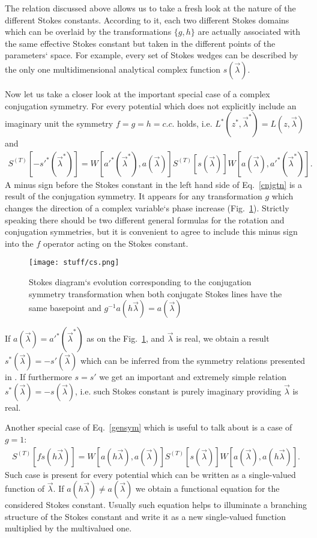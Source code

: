 \documentclass[aps,prl,preprint,superscriptaddress]{revtex4}
\begin{document}
The relation discussed above allows us to take a fresh look at the nature of the different Stokes constants. According to it, each two different Stokes domains which can be overlaid by the transformations $\{g,h\}$ are actually associated with the same effective Stokes constant but taken in the different points of the parameters` space. For example, every set of Stokes wedges can be described by the only one multidimensional analytical complex function $s(\vec{\lambda})$.

Now let us take a closer look at the important special case of a complex conjugation symmetry. For every potential which does not explicitly include an imaginary unit the symmetry $f=g=h=c.c.$ holds, i.e. $L^*(z^*,\vec{\lambda}^*)=L(z,\vec{\lambda})$ and
\begin{eqnarray}
S^{(T)}[-s'^*(\vec{\lambda}^*)] = 
W[a'^*(\vec{\lambda}^*),a(\vec{\lambda})]S^{(T)}[s(\vec{\lambda})]W[a(\vec{\lambda}),a'^*(\vec{\lambda}^*)].
\label{cnjgtn}
\end{eqnarray}
A minus sign before the Stokes constant in the left hand side of Eq.~\ref{cnjgtn} is a result of the conjugation symmetry. It appears for any transformation $g$ which changes the direction of a complex variable`s phase increase (Fig.~\ref{cs}). Strictly speaking there should be two different general formulas for the rotation and conjugation symmetries, but it is convenient to agree to include this minus sign into the $f$ operator acting on the Stokes constant.

\begin{figure}
\centering
\noindent
\texttt{[image: stuff/cs.png]}
\caption{Stokes diagram`s evolution corresponding to the conjugation symmetry transformation when both conjugate Stokes lines have the same basepoint and $g^{-1}a(h\vec{\lambda})=a(\vec{\lambda})$}
\label{cs}
\end{figure} 

If $a(\vec{\lambda})=a'^*(\vec{\lambda}^*)$ as on the Fig.~\ref{cs}, and $\vec{\lambda}$ is real, we obtain a result 
$s^*(\vec{\lambda})=-s'(\vec{\lambda})$ which can be inferred from the symmetry relations presented in \cite{symm}. 
If furthermore $s=s'$ we get an important and extremely simple relation $s^*(\vec{\lambda})=-s(\vec{\lambda})$, i.e. such Stokes constant is purely imaginary providing $\vec{\lambda}$ is real.

Another special case of Eq.~\ref{gensym} which is useful to talk about is a case of $g=1$:
\begin{eqnarray}
S^{(T)}[f s(h\vec{\lambda})] = 
W[a(h\vec{\lambda}),a(\vec{\lambda})]S^{(T)}[s(\vec{\lambda})]W[a(\vec{\lambda}),a(h\vec{\lambda})].
\label{funceq}
\end{eqnarray}
Such case is present for every potential which can be written as a single-valued function of $\vec{\lambda}$. If $a(h\vec{\lambda}) \neq a(\vec{\lambda})$ we obtain a functional equation for the considered Stokes constant. Usually such equation helps to illuminate a branching structure of the Stokes constant and write it as a new single-valued function multiplied by the multivalued one.
\end{document}
